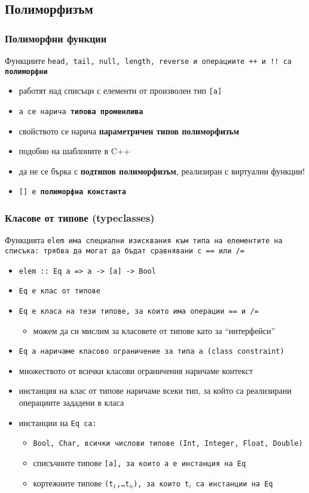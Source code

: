 \documentclass{beamer}
\begin{document}
\subsection{Полиморфизъм}

\begin{frame}
  \frametitle{Полиморфни функции}
  Функциите \tt{head}, \tt{tail}, \tt{null}, \tt{length}, \tt{reverse} и операциите \tt{++} и \tt{!!} са \textbf{полиморфни}
  \begin{itemize}[<+->]
  \item работят над списъци с елементи от произволен тип \tt{[a]}
  \item \tt a се нарича \textbf{типова променлива}
  \item свойството се нарича \textbf{параметричен типов полиморфизъм}
  \item подобно на шаблоните в C++
  \item \alert{да не се бърка с \textbf{подтипов полиморфизъм}, реализиран с виртуални функции!}
  \item \tt{[]} е \textbf{полиморфна константа}
  \end{itemize}
\end{frame}

\begin{frame}
  \frametitle{Класове от типове (typeclasses)}
  Функцията \tt{elem} има специални изисквания към типа на елементите на списъка: трябва да могат да бъдат сравнявани с \tt{==} или \tt{/=}
  \begin{itemize}[<+->]
  \item \tt{elem :: \alert{Eq a => }a -> [a] -> Bool}
  \item \tt{Eq} е \alert{клас от типове}
  \item \tt{Eq} е класа на тези типове, за които има операции \tt{==} и \tt{/=}
    \begin{itemize}
    \item можем да си мислим за класовете от типове като за ``интерфейси''
    \end{itemize}
  \item \tt{Eq a} наричаме \alert{класово ограничение} за типа \tt a (class constraint)
  \item множеството от всички класови ограничения наричаме \alert{контекст}
  \item \alert{инстанция} на клас от типове наричаме всеки тип, за който са реализирани операциите зададени в класа
  \item инстанции на \tt{Eq} са:
    \begin{itemize}
    \item \tt{Bool}, \tt{Char}, всички числови типове (\tt{Int}, \tt{Integer}, \tt{Float}, \tt{Double})
    \item списъчните типове \tt{[a]}, за които \tt a е инстанция на \tt{Eq}
    \item кортежните типове \tt{(t$_1$,\ldots t$_n$)}, за които \tt{t$_i$} са инстанции на \tt{Eq}
    \end{itemize}
  \end{itemize}
\end{frame}
\end{document}
